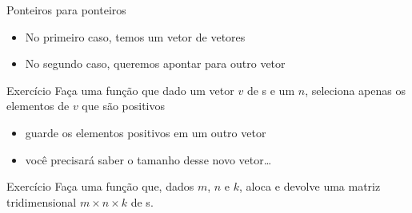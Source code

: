 \documentclass{beamer}
\begin{document}
\begin{frame}[<+->]{Ponteiros para ponteiros}
  \action{}

  \medskip

  \action{}

  \bigskip
  \begin{itemize}
    \item No primeiro caso, temos um vetor de vetores
    \item No segundo caso, queremos apontar para outro vetor
  \end{itemize}

\end{frame}

\begin{frame}{Exercício}
  Faça uma função que dado um vetor \alert{$v$} de s e um  $n$, seleciona apenas os elementos de \alert{$v$} que são positivos
  \begin{itemize}
    \item guarde os elementos positivos em um outro vetor
    \item você precisará saber o tamanho desse novo vetor\dots
  \end{itemize}
\end{frame}

\begin{frame}{Exercício}
  Faça uma função que, dados \alert{$m$}, \alert{$n$} e \alert{$k$}, aloca e devolve uma matriz tridimensional \alert{$m \times n \times k$} de s.
\end{frame}
\end{document}
